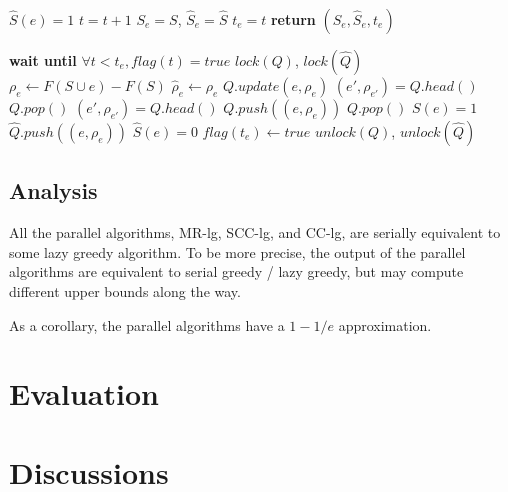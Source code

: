 \documentclass{article}
\newcommand{\mrlz}{MR-lg}
\newcommand{\occlz}{SCC-lg}
\newcommand{\pcclz}{CC-lg}
\begin{document}
\begin{algorithm}[tb]
  \caption{$getBounds(e)$}
  \label{alg:cclz:getbound}
\begin{algorithmic}
  \STATE $\widehat{S}(e) = 1$
  \STATE $t = t + 1$
  \STATE $S_e = S$, $\widehat{S}_e = \widehat{S}$
  \STATE $t_e = t$
  \STATE \textbf{return} $(S_e, \widehat{S}_e, t_e)$
\end{algorithmic}
\end{algorithm}


\begin{algorithm}[tb]
  \caption{$commit(e, \rho_e, \widehat\rho_e, t_e)$}
  \label{alg:cclz:commit}
\begin{algorithmic}
  \STATE \textbf{wait until} $\forall t < t_e, flag(t) = true$
  \STATE $lock(Q)$, $lock(\widehat{Q})$
    \STATE $\rho_e         \leftarrow F(S\cup e) - F(S)$
    \STATE $\widehat\rho_e \leftarrow \rho_e$
  \ENDIF
  \STATE $Q.update(e, \rho_e)$
  \STATE $(e', \rho_{e'}) = Q.head()$
    \STATE $Q.pop()$
    \STATE $(e', \rho_{e'}) = Q.head()$
    \STATE $Q.push((e, \rho_e))$
  \ENDIF
    \STATE $Q.pop()$
    \STATE $S(e) = 1$
  \ELSE
    \STATE $\widehat{Q}.push((e, \rho_e))$
    \STATE $\widehat{S}(e) = 0$
  \ENDIF
  \STATE $flag(t_e) \leftarrow true$
  \STATE $unlock(Q)$, $unlock(\widehat{Q})$
\end{algorithmic}
\end{algorithm}





\subsection{Analysis}
All the parallel algorithms, \mrlz{}, \occlz{}, and \pcclz{}, are serially equivalent to some lazy greedy algorithm.
To be more precise, the output of the parallel algorithms are equivalent to serial greedy / lazy greedy, but may compute different upper bounds along the way.

As a corollary, the parallel algorithms have a $1-1/e$ approximation.
\section{Evaluation}
\label{sec:evaluation}

\section{Discussions}
\label{sec:discussions}

 




\end{document}
